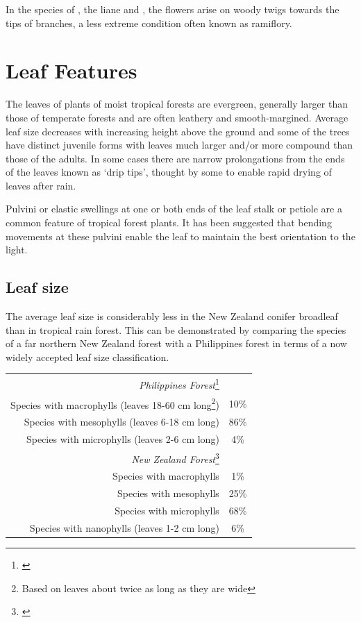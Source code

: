 In the species of ,  the liane  and , the flowers arise on woody twigs towards the tips of branches, a less extreme condition often known as ramiflory.

\section{Leaf Features}

The leaves of plants of moist tropical forests are evergreen, generally larger than those of temperate forests and are often leathery and smooth-margined.
Average leaf size decreases with increasing height above the ground and some of the trees have distinct juvenile forms with leaves much larger and/or more compound than those of the adults.
In some cases there are narrow prolongations from the ends of the leaves known as `drip tips', thought by some to enable rapid drying of leaves after rain.

Pulvini or elastic swellings at one or both ends of the leaf stalk or petiole are a common feature of tropical forest plants.
It has been suggested that bending movements at these pulvini enable the leaf to maintain the best orientation to the light.

\subsection{Leaf size}

The average leaf size is considerably less in the New Zealand conifer broadleaf than in tropical rain forest.
This can be demonstrated by comparing the species of a far northern New Zealand forest with a Philippines forest in terms of a now widely accepted leaf size classification.

\begin{xltabular}{0.8\textwidth}{ R c }
    \toprule
    \emph{Philippines Forest}\footnote{\cite{richards1952tropical}}\\
    Species with macrophylls (leaves 18-60 cm long\footnote{Based on leaves about twice as long as they are wide}) & 10\%\\
    Species with mesophylls (leaves 6-18 cm long) & 86\%\\
    Species with microphylls (leaves 2-6 cm long) & 4\%\\
    \emph{New Zealand Forest}\footnote{\cite{dawson1969lowland}}\\
    Species with macrophylls & 1\%\\
    Species with mesophylls & 25\%\\
    Species with microphylls & 68\%\\
    Species with nanophylls (leaves 1-2 cm long) & 6\%\\
    \bottomrule
\end{xltabular}

